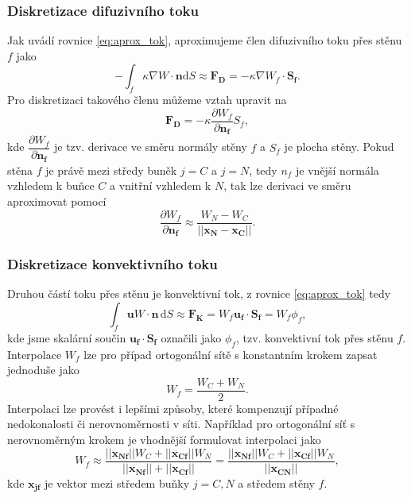 \subsubsection{Diskretizace difuzivního toku}
Jak uvádí rovnice \ref{eq:aprox_tok}, aproximujeme člen difuzivního toku přes stěnu $f$ jako
\begin{equation}
-\int_f \kappa \nabla W \cdot \mathbf{n}\mathrm{d}S \approx \mathbf{F_D} = -\kappa \nabla W_f \cdot \mathbf{S_f}.
\end{equation}
Pro diskretizaci takového členu můžeme vztah upravit na
\begin{equation}
\mathbf{F_D} = -\kappa \dfrac{\partial W_f}{\partial \mathbf{n_f}} S_f,
\end{equation}
kde $\dfrac{\partial W_f}{\partial \mathbf{n_f}}$ je tzv. derivace ve směru normály stěny $f$ a $S_f$ je plocha stěny. Pokud stěna $f$ je právě mezi středy buněk $ j=C $ a $ j=N $, tedy $ n_f $ je vnější normála vzhledem k buňce $ C $ a vnitřní vzhledem k $ N $, tak lze derivaci ve směru aproximovat pomocí 
\begin{equation}
\dfrac{\partial W_f}{\partial \mathbf{n_f}} \approx \dfrac{W_N-W_C}{||\mathbf{x_N}-\mathbf{x_C}||}.
\end{equation}

\subsubsection{Diskretizace konvektivního toku}
Druhou částí toku přes stěnu je konvektivní tok, z rovnice \ref{eq:aprox_tok} tedy
\begin{equation}
\int_f \mathbf{u}W\cdot \mathbf{n}\, \mathrm{d}S
\approx
\mathbf{F_K}
=
W_f \mathbf{u_f}\cdot \mathbf{S_f}=W_f\phi_f,
\end{equation}
kde jsme skalární součin $ \mathbf{u_f}\cdot \mathbf{S_f} $ označili jako $ \phi_f $, tzv. konvektivní tok přes stěnu $ f $. Interpolace $ W_f $ lze pro případ ortogonální sítě s konstantním krokem zapsat jednoduše jako
\begin{equation}
W_f = \dfrac{W_C+W_N}{2}.
\end{equation}
Interpolaci lze provést i lepšími způsoby, které kompenzují případné nedokonalosti či nerovnoměrnosti v síti. Například pro ortogonální síť s nerovnoměrným krokem je vhodnější formulovat interpolaci jako
\begin{equation}
W_f \approx \dfrac{||\mathbf{x_{Nf}}|| W_C + ||\mathbf{x_{Cf}}|| W_N }
{||\mathbf{x_{Nf}}|| + ||\mathbf{x_{Cf}}||}
= 
\dfrac{||\mathbf{x_{Nf}}|| W_C + ||\mathbf{x_{Cf}}|| W_N }
{||\mathbf{x_{CN}}||},
\end{equation}
kde $ \mathbf{x_{jf}} $ je vektor mezi středem buňky $ j=C,N $ a středem stěny $ f $.

